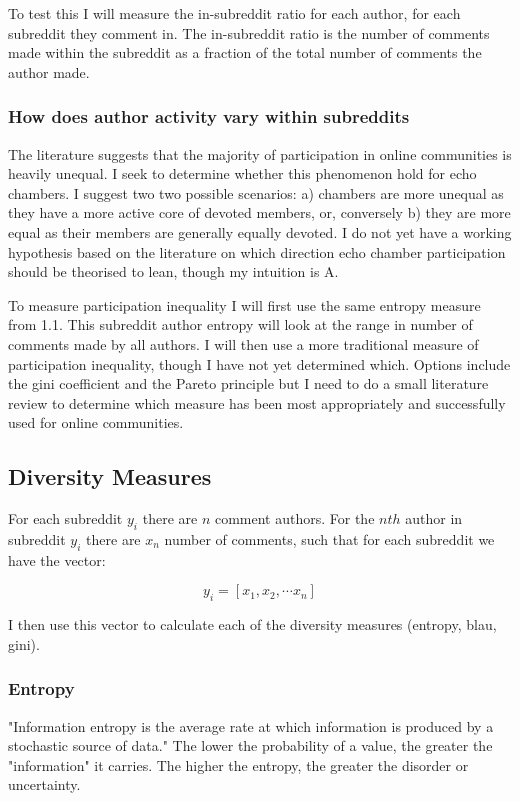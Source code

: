 \documentclass{article}
\begin{document}
To test this I will measure the in-subreddit ratio for each author, for each subreddit they comment in. The in-subreddit ratio is the number of comments made within the subreddit as a fraction of the total number of comments the author made.

\subsubsection{How does author activity vary within subreddits}

The literature suggests that the majority of participation in online communities is heavily unequal. I seek to determine whether this phenomenon hold for echo chambers. I suggest two two possible scenarios: a) chambers are more unequal as they have a more active core of devoted members, or, conversely b) they are more equal as their members are generally equally devoted. I do not yet have a working hypothesis based on the literature on which direction echo chamber participation should be theorised to lean, though my intuition is A.

To measure participation inequality I will first use the same entropy measure from 1.1. This subreddit author entropy will look at the range in number of comments made by all authors. I will then use a more traditional measure of participation inequality, though I have not yet determined which. Options include the gini coefficient and the Pareto principle but I need to do a small literature review to determine which measure has been most appropriately and successfully used for online communities.


\subsection{Diversity Measures}
For each subreddit $y_i$ there are $n$ comment authors. For the $nth$ author in subreddit $y_i$ there are $x_n$ number of comments, such that for each subreddit we have the vector:

$$y_i = [x_1, x_2, \cdots x_n]$$

I then use this vector to calculate each of the diversity measures (entropy, blau, gini).


\subsubsection{Entropy}

"Information entropy is the average rate at which information is produced by a stochastic source of data." The lower the probability of a value, the greater the "information" it carries. The higher the entropy, the greater the disorder or uncertainty.
\end{document}
